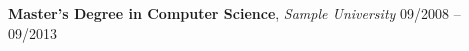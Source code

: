 
\textbf{Master's Degree in Computer Science}, \textit{Sample University}
\hfill
09/2008 -- 09/2013

\vspace{-2mm}
